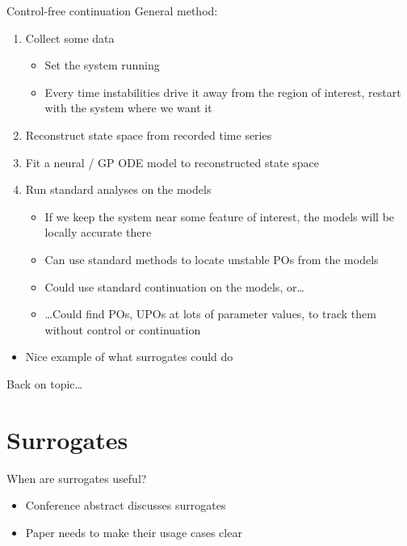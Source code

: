 \documentclass[presentation]{beamer}
\begin{document}
\begin{frame}[<+->][label={sec:orgf020b69}]{Control-free continuation}
General method:
\begin{enumerate}
\item Collect some data
\begin{itemize}
\item Set the system running
\item Every time instabilities drive it away from the region of interest, restart with the system where we want it
\end{itemize}
\item Reconstruct state space from recorded time series
\item Fit a neural / GP ODE model to reconstructed state space
\item Run standard analyses on the models
\begin{itemize}
\item If we keep the system near some feature of interest, the models will be locally accurate there
\item Can use standard methods to locate unstable POs from the models
\item Could use standard continuation on the models, or\ldots{}
\item \ldots{}Could find POs, UPOs at lots of parameter values, to track them without control or continuation
\end{itemize}
\end{enumerate}
\begin{itemize}
\item Nice example of what surrogates could do
\end{itemize}
\end{frame}

\begin{frame}[label={sec:orgd94bd7a}]{}
\begin{center}
Back on topic\ldots{}
\end{center}
\end{frame}

\section{Surrogates}
\label{sec:org4917d13}
\begin{frame}[label={sec:org3d62ac8}]{When are surrogates useful?}
\begin{itemize}
\item Conference abstract discusses surrogates
\item Paper needs to make their usage cases clear
\end{itemize}
\end{frame}
\end{document}
